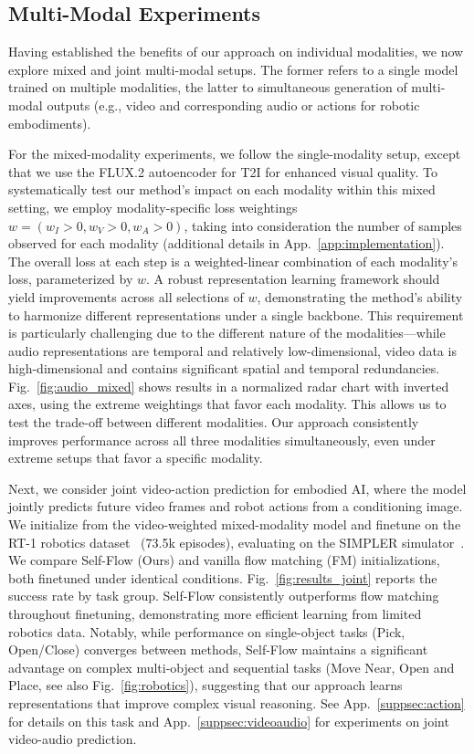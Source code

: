 \subsection{Multi-Modal Experiments}
\label{subsec:multimodal}
Having established the benefits of our approach on individual modalities, we now explore mixed and joint multi-modal setups. The former refers to a single model trained on multiple modalities, the latter to simultaneous generation of multi-modal outputs (e.g., video and corresponding audio or actions for robotic embodiments).

For the mixed-modality experiments, we follow the single-modality setup, except that we use the FLUX.2 autoencoder for T2I for enhanced visual quality. To systematically test our method's impact on each modality within this mixed setting, we employ modality-specific loss weightings $w=(w_I>0,w_V>0,w_A>0)$, taking into consideration the number of samples observed for each modality (additional details in App.~\ref{app:implementation}). 
The overall loss at each step is a weighted-linear combination of each modality's loss, parameterized by $w$. A robust representation learning framework should yield improvements across all selections of $w$, demonstrating the method's ability to harmonize different representations under a single backbone. This requirement is particularly challenging due to the different nature of the modalities---while audio representations are temporal and relatively low-dimensional, video data is high-dimensional and contains significant spatial and temporal redundancies. Fig.~\ref{fig:audio_mixed} shows results in a normalized radar chart with inverted axes, using the extreme weightings that favor each modality. This allows us to test the trade-off between different modalities. Our approach consistently improves performance across all three modalities simultaneously, even under extreme setups that favor a specific modality.

Next, we consider joint video-action prediction for embodied AI, where the model jointly predicts future video frames and robot actions from a conditioning image. We initialize from the video-weighted mixed-modality model and finetune on the RT-1 robotics dataset~\citep{rt1} (73.5k episodes), evaluating on the SIMPLER simulator~\citep{simpler}. We compare Self-Flow (Ours) and vanilla flow matching (FM) initializations, both finetuned under identical conditions.
Fig.~\ref{fig:results_joint} reports the success rate by task group. Self-Flow consistently outperforms flow matching throughout finetuning, demonstrating more efficient learning from limited robotics data. Notably, while performance on single-object tasks (Pick, Open/Close) converges between methods, Self-Flow maintains a significant advantage on complex multi-object and sequential tasks (Move Near, Open and Place, see also Fig.~\ref{fig:robotics}), suggesting that our approach learns representations that improve complex visual reasoning. See App.~\ref{suppsec:action} for details on this task and App.~\ref{suppsec:videoaudio} for experiments on joint video-audio prediction.

